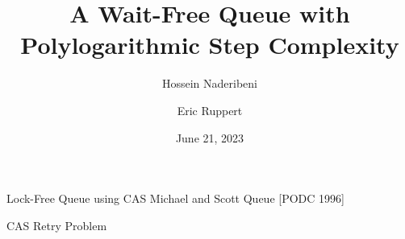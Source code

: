 \documentclass[compress]{beamer}
\title{A Wait-Free Queue with Polylogarithmic Step Complexity}
\author{Hossein Naderibeni \and Eric Ruppert}
\date{June 21, 2023}
\begin{document}
\begin{frame}
\maketitle
\end{frame}

\begin{frame}{Lock-Free Queue using CAS}
Michael and Scott Queue [PODC 1996]

\bigskip


\end{frame}

\begin{frame}{CAS Retry Problem}



\end{frame}
\end{document}
